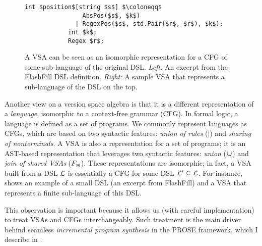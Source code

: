 \begin{figure}[t]
    \begin{minipage}[b]{0.42\textwidth}
        \uwsinglespace
        \begin{lstlisting}[language=dsl, gobble=12]
            int $position$[string $s$] $\coloneqq$
                AbsPos($s$, $k$)
              | RegexPos($s$, std.Pair($r$, $r$), $k$);
            int $k$;
            Regex $r$;
        \end{lstlisting}
    \end{minipage}
    \hspace*{-5pt}
    \begin{minipage}[t]{0.577\textwidth}
        \small
        \begin{dot2tex}[options=--usepdflatex --figonly]
            
        \end{dot2tex}
    \end{minipage}
    \vspace*{-\baselineskip}
    \caption{
        A VSA can be seen as an isomorphic representation for a CFG of some sub-language of the original DSL.
        \emph{Left:} An excerpt from the FlashFill DSL definition.
        \emph{Right:} A sample VSA that represents a sub-language of the DSL on the top.}
    \label{fig:vsa:language-repr}
\end{figure}

Another view on a version space algebra is that it is a different representation of a \emph{language}, isomorphic to a
context-free grammar (CFG).
In formal logic, a language is defined as a set of programs.
We commonly represent languages as CFGs, which are based on two syntactic features: \emph{union of rules} ($|$) and
\emph{sharing of nonterminals}.
A VSA is also a representation for a set of programs; it is an AST-based representation that leverages
two syntactic features: \emph{union} ($\vsaunion$) and \emph{join of shared VSAs} ($\joinCons$).
These representations are isomorphic; in fact, a VSA built from a DSL $\dsl$ is essentially a CFG for some DSL $\dsl'
\subseteq \dsl$.
For instance,  shows an example of a small DSL (an excerpt from FlashFill) and a VSA that
represents a finite sub-language of this DSL.

This observation is important because it allows us (with careful implementation) to treat VSAs and CFGs interchangeably.
Such treatment is the main driver behind seamless \emph{incremental program synthesis} in the PROSE framework, which I
describe in .
